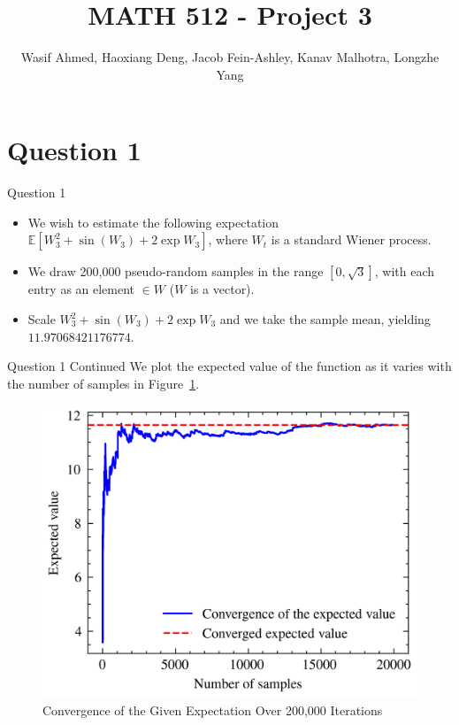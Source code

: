 \documentclass[compress,12pt]{beamer}
\title{MATH 512 - Project 3}
\subtitle{}
\date{}
\author{Wasif Ahmed, Haoxiang Deng, Jacob Fein-Ashley, Kanav Malhotra, Longzhe Yang}
\begin{document}
\frame[plain]{\titlepage}

\section{Question 1}


\begin{frame}{Question 1}

    \begin{itemize}
        \item We wish to estimate the following expectation $\mathbb{E}[W_3^2 + \sin(W_3) + 2\exp{W_3}]$, where $W_t$ is a standard Wiener process.

        \item We draw 200,000 pseudo-random samples in the range $[0, \sqrt{3}]$, with each entry as an element $\in W$ ($W$ is a vector).

        \item Scale $W_3^2 + \sin(W_3) + 2\exp{W_3}$ and we take the sample mean, yielding $\boxed{11.97068421176774}$.

    \end{itemize}
 
\end{frame}

\begin{frame}{Question 1 Continued}
    We plot the expected value of the function as it varies with the number of samples in Figure~\ref{fig:convergence}.

    \begin{figure}
        \centering
        \includegraphics{imgs/convergence.png}
        \caption{Convergence of the Given Expectation Over 200,000 Iterations}
        \label{fig:convergence}
    \end{figure}
\end{frame}
\end{document}
